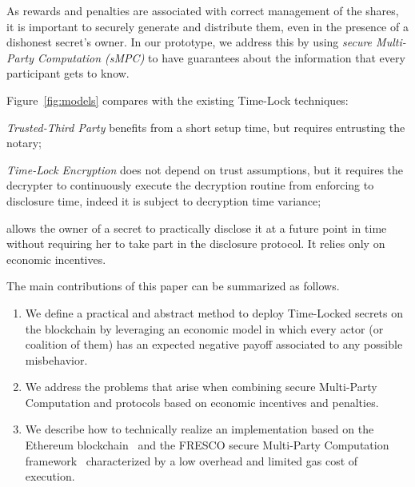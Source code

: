 As rewards and penalties are associated with correct management of the shares, it is important to securely generate and distribute them, even in the presence of a dishonest secret's owner.
In our prototype, we address this by using {\em secure Multi-Party Computation (sMPC)} to have guarantees about the information that every participant gets to know.

Figure~\ref{fig:models} compares \shortname with the existing Time-Lock techniques:

\begin{compactitem}
	\item {\em Trusted-Third Party} benefits from a short setup time, but requires entrusting the notary;
	
	\item {\em Time-Lock Encryption} does not depend on trust assumptions, but it requires the decrypter to continuously execute the decryption routine from enforcing to disclosure time, indeed it is subject to decryption time variance;
	
	\item {\em \name} allows the owner of a secret to practically disclose it at a future point in time without requiring her to take part in the disclosure protocol. It relies only on economic incentives.
\end{compactitem}


The main contributions of this paper can be summarized as follows.

\begin{enumerate}

	\smallskip
 	\item We define a practical and abstract method to deploy Time-Locked secrets on the blockchain by leveraging an economic model in which every actor (or coalition of them) has an expected negative payoff associated to any possible misbehavior.
 	
 	\smallskip
 	\item We address the problems that arise when combining secure Multi-Party Computation and protocols based on economic incentives and penalties. 
  
  	\smallskip
 	\item We describe how to technically realize an implementation based on the Ethereum blockchain~\cite{wood2014ethereum} and the FRESCO secure Multi-Party Computation framework~\cite{damgaard2016mpc} characterized by a low overhead and limited gas cost of execution.

\end{enumerate}

